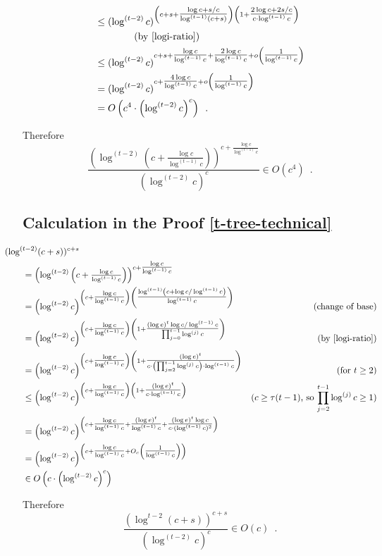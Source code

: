 \documentclass[kpfonts]{patmorin}
\theoremstyle{named}
\begin{document}
\begin{align*}
    & \le (\log^{(t-2)}c)^{\left(c+s+\tfrac{\log c+s/c}{\log^{(t-1)}(c+s)}\right)
        \left(1 + \tfrac{2\log c+2s/c}{c\cdot\log^{(t-1)}c}\right)} \\            & \qquad\qquad\text{(by \cref{logi-ratio})} \\
    & \le (\log^{(t-2)}c)^{c+s+\tfrac{\log c}{\log^{(t-1)}c} +
        \tfrac{2\log c}{\log^{(t-1)}c} + o\left(\tfrac{1}{\log^{(t-1)} c}\right)}  \\
    & = (\log^{(t-2)}c)^{c+\tfrac{4\log c}{\log^{(t-1)}c} + o\left(\tfrac{1}{\log^{(t-1)} c}\right)}  \\
    & = O\left(c^4\cdot\left(\log^{(t-2)}c\right)^{c}\right) \enspace .
\end{align*}

Therefore
\[
  \frac{\left(\log^{(t-2)}\left(c+\tfrac{\log c}{\log^{(t-1)} c}\right)\right)^{c+\tfrac{\log c}{\log^{(t-1)} c}}}
  {(\log^{(t-2)} c)^c}
  \in O(c^4) \enspace .
\]

\subsection{Calculation in the Proof \cref{t-tree-technical}}


\begin{align*}
    & \hspace{-2em}(\log^{(t-2)}(c+s))^{c+s} \\
    & = \left(\log^{(t-2)}\left(c+\tfrac{\log c}{\log^{(t-1)} c}\right)\right)^{c+\tfrac{\log c}{\log^{(t-1)} c}} \\
    & = \left(\log^{(t-2)}c\right)^{\left(c+\tfrac{\log c}{\log^{(t-1)} c}\right)
    \left(\tfrac{\log^{(t-1)}\left(c+\log c/\log^{(t-1)} c\right)}{\log^{(t-1)} c}\right)} &\text{(change of base)} \\
    & = \left(\log^{(t-2)}c\right)^{\left(c+\tfrac{\log c}{\log^{(t-1)} c}\right)
    \left(
    1 + \tfrac{(\log e)^t\log c/\log^{(t-1)} c}{\prod_{j=0}^{t-1}\log^{(j)}c}
    \right)} & \text{(by \cref{logi-ratio})} \\
    & = \left(\log^{(t-2)}c\right)^{\left(c+\tfrac{\log c}{\log^{(t-1)} c}\right)
    \left(
    1 + \tfrac{(\log e)^t}{c\cdot\left(\prod_{j=2}^{t-1}\log^{(j)}c\right)\cdot\log^{(t-1)} c}
    \right)} & \text{(for $t\ge 2$)} \\
    & \le \left(\log^{(t-2)}c\right)^{\left(c+\tfrac{\log c}{\log^{(t-1)} c}\right)
    \left(
    1 + \tfrac{(\log e)^t}{c\cdot\log^{(t-1)} c}
    \right)} & \text{($c\ge \tau(t-1)$, so $\prod_{j=2}^{t-1}\log^{(j)}c\ge 1$)} \\
    & = \left(\log^{(t-2)}c\right)^{\left(c+\tfrac{\log c}{\log^{(t-1)} c}+
    \tfrac{(\log e)^t}{\log^{(t-1)} c} + \tfrac{(\log e)^t\log c}{c\cdot(\log^{(t-1)} c)^2}
    \right)}  \\
    & = \left(\log^{(t-2)}c\right)^{\left(c+\tfrac{\log c}{\log^{(t-1)} c}
      + O_c\left(\tfrac{1}{\log^{(t-1)} c}\right)
    \right)}  \\
    & \in O\left(c\cdot\left(\log^{(t-2)}c\right)^c\right)
\end{align*}

Therefore
\[
    \frac{(\log^{t-2} (c+s))^{c+s}}{(\log^{(t-2)}c)^c} \in O(c) \enspace .
\]
\end{document}
